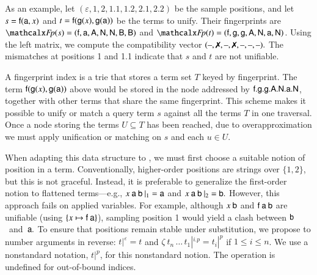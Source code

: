 \newcommand\fpok{\text{--}}

As an example,
let $(\varepsilon, 1,\allowbreak 2,\allowbreak 1.1,\allowbreak 1.2,\allowbreak 2.1, 2.2)$
be the sample positions,
and let $s = \mathsf{f}(\mathsf{a}, x)$ and $t = \mathsf{f}(\mathsf{g}(x), \mathsf{g}(\mathsf{a}))$
be the terms to unify. Their fingerprints are
$\Fp(s) = (\cst{f}, \cst{a}, \AA, \NN, \NN,\allowbreak \BB, \BB)$
and
$\Fp(t) = (\cst{f}, \cst{g}, \cst{g}, \AA, \NN, \cst{a}, \NN)$.
%
Using the left matrix, we compute the compatibility vector
%
$(\fpok, \xmark, \fpok, \xmark, \fpok, \fpok, \fpok).$
%
The mismatches at positions 1 and 1.1 indicate that $s$ and $t$ are not unifiable.

A fingerprint index is a trie that stores a term set $T$ keyed by fingerprint.
The term $\mathsf{f}(\mathsf{g}(x), \mathsf{g}(\mathsf{a}))$ above would
be stored in the node addressed by
$\mathsf{f}.\mathsf{g}.\mathsf{g}.{\textsf{A}}.{\textsf{N}}.\mathsf{a}.{\textsf{N}}$, together with other
terms that share the same fingerprint.
This scheme makes it possible to unify or match a query term $s$
against all the terms $T$ in one traversal. Once a node storing the terms $U
\subseteq T$ has been reached, due to overapproximation we must apply
unification or matching on $s$ and each $u \in U.$ %

When adapting this data structure to \lfhol{}, we must first choose a
suitable notion of position in a term. Conventionally, higher-order
positions are strings over $\{1, 2\}$, but this is not graceful.
Instead, it is preferable to generalize the first-order notion to
flattened \lfhol{} terms---e.g.,
$x\> \mathsf{a} \> \mathsf{b} \> |_{1} = \mathsf{a}$
and $x\> \mathsf{a} \> \mathsf{b} \> |_{2} = \mathsf{b}.$
%
However, this approach fails on applied variables. For example,
although $x \> \mathsf{b}$ and $\mathsf{f} \> \mathsf{a} \> \mathsf{b}$ are
unifiable (using $\{ x \mapsto \mathsf{f} \> \mathsf{a} \}$), sampling position 1
would yield a clash between
$\mathsf{b}$~and~$\mathsf{a}.$ To ensure that positions remain stable under
substitution, we propose to number arguments in reverse:
$t {|}^\varepsilon = t$ and
$\zeta \> t_n \, \ldots \, t_1  |^{i.p} = t_{i} |^p$
if $1 \le i \le n$.
We use a nonstandard notation, $t|^p$, for this nonstandard
notion. The operation is undefined for out-of-bound indices.

